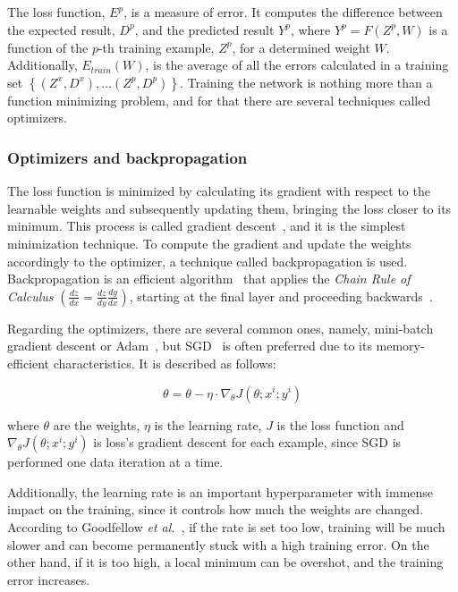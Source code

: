 \documentclass[class=report, crop=false, a4paper, 12pt]{standalone}
\begin{document}
\noindent The loss function, $E^p$, is a measure of error. It computes the difference between the expected result, $D^p$, and the predicted result $Y^p$, where $Y^p = F(Z^p, W)$ is a function of the $p$-th training example, $Z^p$, for a determined weight $W$. Additionally, $E_{train}(W)$, is the average of all the errors calculated in a training set $\left\{(Z^x, D^x),\dots (Z^p, D^p)\right\}$. Training the network is nothing more than a function minimizing problem, and for that there are several techniques called optimizers.

\subsubsection{Optimizers and backpropagation}

\par The loss function is minimized by calculating its gradient with respect to the learnable weights and subsequently updating them, bringing the loss closer to its minimum. This process is called gradient descent~\autocite{ruderOverviewGradientDescent}, and it is the simplest minimization technique. To compute the gradient and update the weights accordingly to the optimizer, a technique called backpropagation is used. Backpropagation is an efficient algorithm~\autocite{6795724} that applies the \textit{Chain Rule of Calculus} $\left(\frac{dz}{dx} = \frac{dz}{dy}\frac{dy}{dx}\right)$, starting at the final layer and proceeding backwards~\autocite{Goodfellow-et-al-2016}.

\par Regarding the optimizers, there are several common ones, namely, mini-batch gradient descent or \gls{Adam}~\autocite{kingmaAdamMethodStochastic2015}, but \gls{SGD}~\autocite{alzubaidiReviewDeepLearning2021} is often preferred due to its memory-efficient characteristics. It is described as follows:

\begin{equation}
    \theta = \theta - \eta\cdot\nabla_{\theta}J\left(\theta;x^{i};y^{i}\right)
\end{equation}

\noindent where $\theta$ are the weights, $\eta$ is the learning rate, $J$ is the loss function and $\nabla_{\theta}J\left(\theta;x^{i};y^{i}\right)$ is loss's gradient descent for each example, since SGD is performed one data iteration at a time. 
\par Additionally, the learning rate is an important hyperparameter with immense impact on the training, since it controls how much the weights are changed. According to Goodfellow \textit{et al.}~\autocite{Goodfellow-et-al-2016}, if the rate is set too low, training will be much slower and can become permanently stuck with a high training error. On the other hand, if it is too high, a local minimum can be overshot, and the training error increases.
 
\end{document}
